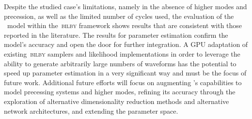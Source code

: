 \documentclass[%
 reprint,
superscriptaddress,
nofootinbib,
 amsmath,amssymb,
 aps,
prd,
floatfix,
]{revtex4-2}
\newcommand{\change}[1]{#1}
\begin{document}
\change{Despite the studied case's limitations, namely in the absence of higher modes and precession, as well as the limited number of cycles used, the evaluation of the \dansur~model within the~\textsc{bilby} framework shows results that are consistent with those reported in the literature. The results for parameter estimation confirm the model's accuracy and open the door for further integration. A GPU adaptation of existing~\textsc{bilby} samplers and likelihood implementations in order to leverage the ability to generate arbitrarily large numbers of waveforms has the potential to speed up parameter estimation in a very significant way and must be the focus of future work. Additional future efforts will focus on augmenting \dansur's capabilities to model precessing systems and higher modes, refining its accuracy through the exploration of alternative dimensionality reduction methods and alternative network architectures, and extending the parameter space.}
\end{document}
